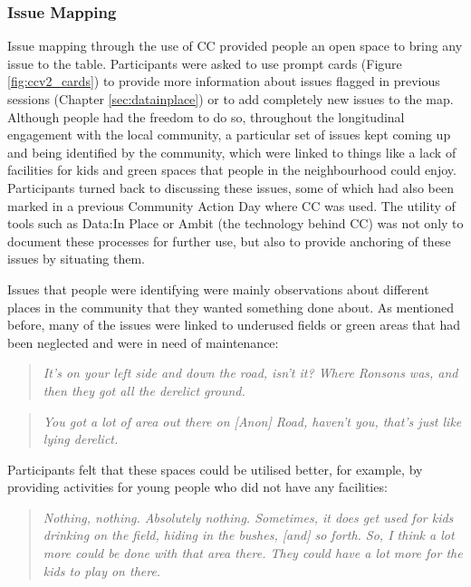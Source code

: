 \subsubsection{Issue Mapping}
Issue mapping through the use of CC provided people an open space to bring any issue to the table. Participants were asked to use prompt cards (Figure \ref{fig:ccv2_cards}) to provide more information about issues flagged in previous sessions (Chapter \ref{sec:datainplace}) or to add completely new issues to the map. Although people had the freedom to do so, throughout the longitudinal engagement with the local community, a particular set of issues kept coming up and being identified by the community, which were linked to things like a lack of facilities for kids and green spaces that people in the neighbourhood could enjoy. Participants turned back to discussing these issues, some of which had also been marked in a previous Community Action Day where CC was used. The utility of tools such as Data:In Place or Ambit (the technology behind CC) was not only to document these processes for further use, but also to provide anchoring of these issues by situating them.

Issues that people were identifying were mainly observations about different places in the community that they wanted something done about. As mentioned before, many of the issues were linked to underused fields or green areas that had been neglected and were in need of maintenance:
\begin{quote}
    \textit{It's on your left side and down the road, isn't it? 
	Where Ronsons was, and then they got all the derelict ground.}
\end{quote}
\begin{quote}
    \textit{You got a lot of area out there on [Anon] Road, haven't you, that's just like lying derelict.}
\end{quote}	

Participants felt that these spaces could be utilised better, for example, by providing activities for young people who did not have any facilities:
\begin{quote}
    \textit{Nothing, nothing. Absolutely nothing. Sometimes, it does get used for kids drinking on the field, hiding in the bushes, [and] so forth. So, I think a lot more could be done with that area there. They could have a lot more for the kids to play on there.}
\end{quote}

